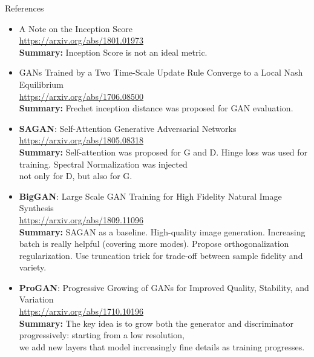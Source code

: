 \documentclass{beamer}
\begin{document}
\begin{frame}{References}
{\tiny
\begin{itemize}
	
	\item A Note on the Inception Score \\
	\href{https://arxiv.org/abs/1801.01973}{https://arxiv.org/abs/1801.01973} \\
	\textbf{Summary:} Inception Score is not an ideal metric.
	
	\item GANs Trained by a Two Time-Scale Update Rule Converge to a Local Nash Equilibrium \\
	\href{https://arxiv.org/abs/1706.08500}{https://arxiv.org/abs/1706.08500} \\
	\textbf{Summary:} Frechet inception distance was proposed for GAN evaluation.
	
	\item \textbf{SAGAN}: Self-Attention Generative Adversarial Networks \\
	\href{https://arxiv.org/abs/1805.08318}{https://arxiv.org/abs/1805.08318} \\
	\textbf{Summary:} Self-attention was proposed for G and D. Hinge loss was used for training. Spectral Normalization was injected \\
	not only for D, but also for G. 
	
	\item \textbf{BigGAN}: Large Scale GAN Training for High Fidelity Natural Image Synthesis \\
	\href{https://arxiv.org/abs/1809.11096}{https://arxiv.org/abs/1809.11096} \\
	\textbf{Summary:} SAGAN as a baseline. High-quality image generation. Increasing batch is really helpful (covering more modes). Propose orthogonalization regularization. Use truncation trick for trade-off between sample fidelity and variety.
	
	\item \textbf{ProGAN}: Progressive Growing of GANs for Improved Quality, Stability, and Variation \\
	\href{https://arxiv.org/abs/1710.10196}{https://arxiv.org/abs/1710.10196} \\
	\textbf{Summary:} The key idea is to grow both the generator and discriminator progressively: starting from a low resolution, \\
	we add new layers that model increasingly fine details as training progresses.
\end{itemize}
}
\end{frame}
\end{document}
